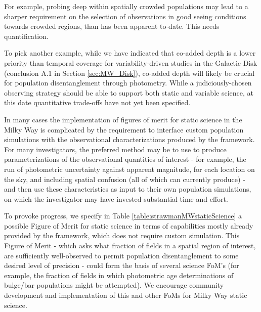   For example, probing deep within spatially crowded
  populations may lead to a sharper requirement on the selection of
  observations in good seeing conditions towards crowded regions, than
  has been apparent to-date. This needs quantification. 

  To pick another example, while we have indicated that co-added
  depth is a lower priority than temporal coverage for
  variability-driven studies in the Galactic Disk (conclusion A.1 in
  Section \ref{sec:MW_Disk}), co-added depth will likely be crucial for
  population disentanglement through photometry. While a
  judiciously-chosen observing strategy should be able to support both
  static and variable science, at this date quantitative trade-offs have not yet been specified.

  In many cases the implementation of figures of merit for static
  science in the Milky Way is complicated by the requirement to
  interface custom population simulations with the observational
  characterizations produced by the \MAF framework. For many
  investigators, the preferred method may be to use \MAF to produce
  parameterizations of the observational quantities of interest - for
  example, the run of photometric uncertainty against apparent
  magnitude, for each location on the sky, and including spatial
  confusion (all of which \MAF can currently produce) - and then use
  these characteristics as input to their own population simulations,
  on which the investigator may have invested substantial time and
  effort.

  To provoke progress, we specify in Table
  \ref{table:strawmanMWstaticScience} a possible Figure of Merit for
  static science in terms of capabilities mostly already provided by
  the \MAF framework, which does not require custom simulation. This
  Figure of Merit - which asks what fraction of fields in a spatial
  region of interest, are sufficiently well-observed to permit
  population disentanglement to some desired level of precision -
  could form the basis of several science FoM's (for example, the
  fraction of fields in which photometric age determinations of
  bulge/bar populations might be attempted). We encourage community
  development and implementation of this and other FoMs for Milky Way
  static science.

